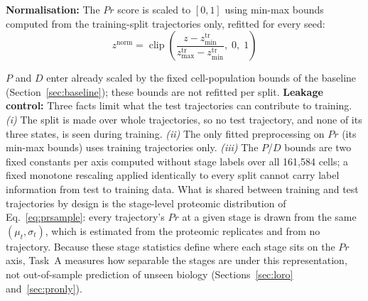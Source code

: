 \documentclass[5p,times,twocolumn]{elsarticle}
\newcommand{\rtag}[1]{}
\newcommand{\rev}[2]{\rtag{#1}#2}
\newenvironment{revblock}[1]{\par\rtag{#1}\ignorespaces}{\par}
\begin{document}
\textbf{Normalisation:}
\rev{R2.6,AC}{The $Pr$ score is scaled to $[0,1]$ using min-max
  bounds computed from the training-split trajectories only,
  refitted for every seed:}
%
\begin{equation}
  z^{\text{norm}} =
    \operatorname{clip}\!\left(
      \frac{z - z^{\text{tr}}_{\min}}
           {z^{\text{tr}}_{\max} - z^{\text{tr}}_{\min}},\;
      0,\; 1
    \right)
  \label{eq:norm}
\end{equation}
\begin{revblock}{R2.6,AC}
  $P$ and $D$ enter already scaled by the fixed cell-population
  bounds of the baseline (Section~\ref{sec:baseline}); these
  bounds are not refitted per split.
  \textbf{Leakage control:} Three facts limit what the test
  trajectories can contribute to training.
  \textit{(i)} The split is made over whole trajectories, so no
  test trajectory, and none of its three states, is seen during
  training.
  \textit{(ii)} The only fitted preprocessing on $Pr$ (its
  min-max bounds) uses training trajectories only.
  \textit{(iii)} The $P$/$D$ bounds are two fixed constants per
  axis computed without stage labels over all 161,584 cells; a
  fixed monotone rescaling applied identically to every split
  cannot carry label information from test to training data.
  What is shared between training and test trajectories by
  design is the stage-level proteomic distribution of
  Eq.~\eqref{eq:prsample}: every trajectory's $Pr$ at a given
  stage is drawn from the same $(\mu_{t}, \sigma_{t})$, which is
  estimated from the proteomic replicates and from no
  trajectory. Because these stage statistics define where each
  stage sits on the $Pr$ axis, Task~A measures how separable the
  stages are under this representation, not out-of-sample
  prediction of unseen biology (Sections~\ref{sec:loro}
  and~\ref{sec:pronly}).
\end{revblock}
\end{document}
